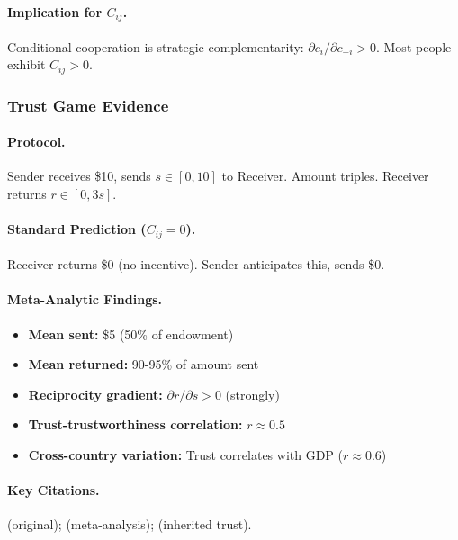 \paragraph{Implication for $C_{ij}$.}
Conditional cooperation is strategic complementarity:
$\partial c_i / \partial c_{-i} > 0$. Most people exhibit $C_{ij} > 0$.


\subsubsection{Trust Game Evidence}

\paragraph{Protocol.}
Sender receives \$10, sends $s \in [0, 10]$ to Receiver.
Amount triples. Receiver returns $r \in [0, 3s]$.

\paragraph{Standard Prediction ($C_{ij} = 0$).}
Receiver returns \$0 (no incentive). Sender anticipates this, sends \$0.

\paragraph{Meta-Analytic Findings.}
\begin{itemize}[nosep]
    \item \textbf{Mean sent:} \$5 (50\% of endowment)
    \item \textbf{Mean returned:} 90-95\% of amount sent
    \item \textbf{Reciprocity gradient:} $\partial r / \partial s > 0$ (strongly)
    \item \textbf{Trust-trustworthiness correlation:} $r \approx 0.5$
    \item \textbf{Cross-country variation:} Trust correlates with GDP ($r \approx 0.6$)
\end{itemize}

\paragraph{Key Citations.}
\citet{bergsend1995} (original); \citet{johnson2011} (meta-analysis);
\citet{alganandcahuc2010} (inherited trust).

